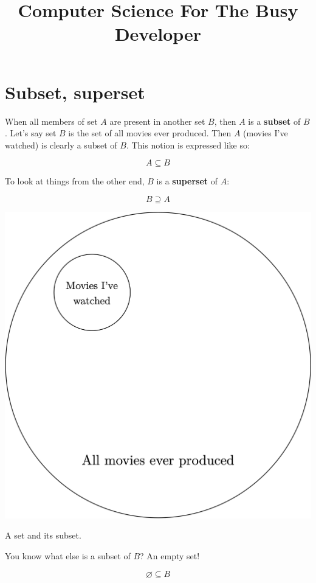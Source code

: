 \documentclass[a4paper, justified, notitlepage, sfsidenotes, notoc]{tufte-book}
\date{}
\title{Computer Science For The Busy Developer}
\begin{document}
\part{Subset, superset}
\label{sec:org75a9e0d}

When all members of set \(A\) are present in another set \(B\), then \(A\) is a \textbf{subset} of \(B\). Let's say set \(B\) is the set of all movies ever produced. Then \(A\) (movies I've watched) is clearly a subset of \(B\). This notion is expressed like so:

\begin{equation}
A \subseteq B
\end{equation}

To look at things from the other end, \(B\) is a \textbf{superset} of \(A\):

\begin{equation}
B \supseteq A
\end{equation}

\begin{marginfigure}
  \includegraphics[width=\linewidth]{images/subset.png}
  \caption{A set and its subset.}
  \label{fig:marginfig}
\end{marginfigure}


You know what else is a subset of \(B\)? An empty set!

\begin{equation}
\varnothing \subseteq B
\end{equation}
\end{document}
